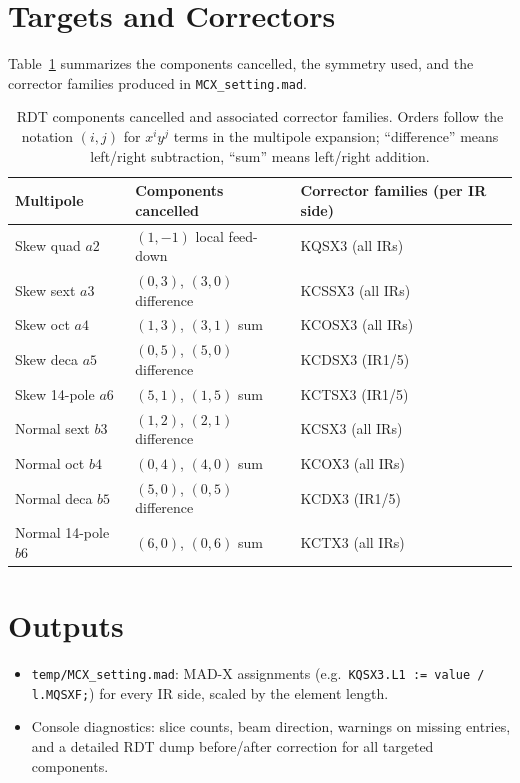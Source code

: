 \documentclass[11pt]{article}
\begin{document}
\section{Targets and Correctors}
Table~\ref{tab:targets} summarizes the components cancelled, the symmetry used, and the corrector families produced in \texttt{MCX\_setting.mad}.

\begin{table}[h]
\centering
\begin{tabular}{lll}
\hline
Multipole & Components cancelled & Corrector families (per IR side) \\
\hline
Skew quad $a2$ & $(1,-1)$ local feed-down & KQSX3 (all IRs) \\
Skew sext $a3$ & $(0,3)$, $(3,0)$ difference & KCSSX3 (all IRs) \\
Skew oct $a4$ & $(1,3)$, $(3,1)$ sum & KCOSX3 (all IRs) \\
Skew deca $a5$ & $(0,5)$, $(5,0)$ difference & KCDSX3 (IR1/5) \\
Skew 14-pole $a6$ & $(5,1)$, $(1,5)$ sum & KCTSX3 (IR1/5) \\
Normal sext $b3$ & $(1,2)$, $(2,1)$ difference & KCSX3 (all IRs) \\
Normal oct $b4$ & $(0,4)$, $(4,0)$ sum & KCOX3 (all IRs) \\
Normal deca $b5$ & $(5,0)$, $(0,5)$ difference & KCDX3 (IR1/5) \\
Normal 14-pole $b6$ & $(6,0)$, $(0,6)$ sum & KCTX3 (all IRs) \\
\hline
\end{tabular}
\caption{RDT components cancelled and associated corrector families. Orders follow the notation $(i,j)$ for $x^{i}y^{j}$ terms in the multipole expansion; ``difference'' means left/right subtraction, ``sum'' means left/right addition.}
\label{tab:targets}
\end{table}

\section{Outputs}
\begin{itemize}
  \item \texttt{temp/MCX\_setting.mad}: MAD-X assignments (e.g.\ \texttt{KQSX3.L1 := value / l.MQSXF;}) for every IR side, scaled by the element length.
  \item Console diagnostics: slice counts, beam direction, warnings on missing entries, and a detailed RDT dump before/after correction for all targeted components.
\end{itemize}
\end{document}
